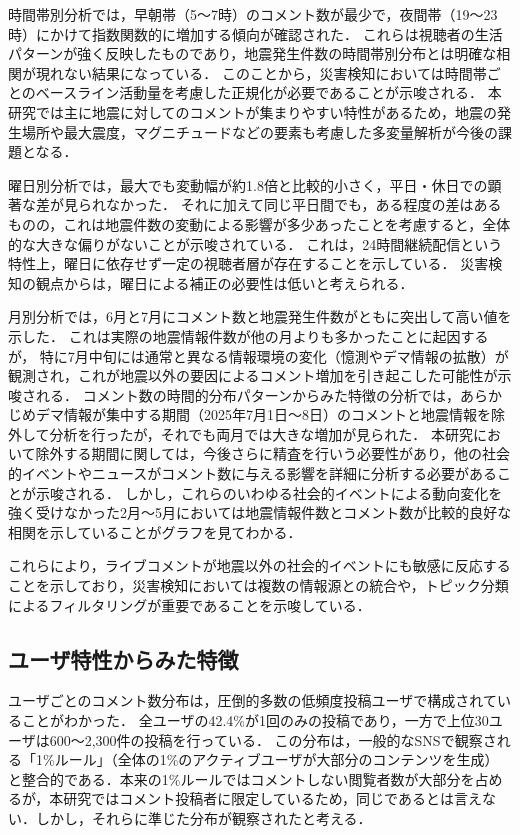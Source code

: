 時間帯別分析では，早朝帯（5〜7時）のコメント数が最少で，夜間帯（19〜23時）にかけて指数関数的に増加する傾向が確認された．
これらは視聴者の生活パターンが強く反映したものであり，地震発生件数の時間帯別分布とは明確な相関が現れない結果になっている．
このことから，災害検知においては時間帯ごとのベースライン活動量を考慮した正規化が必要であることが示唆される．
本研究では主に地震に対してのコメントが集まりやすい特性があるため，地震の発生場所や最大震度，マグニチュードなどの要素も考慮した多変量解析が今後の課題となる．

曜日別分析では，最大でも変動幅が約1.8倍と比較的小さく，平日・休日での顕著な差が見られなかった．
それに加えて同じ平日間でも，ある程度の差はあるものの，これは地震件数の変動による影響が多少あったことを考慮すると，全体的な大きな偏りがないことが示唆されている．
これは，24時間継続配信という特性上，曜日に依存せず一定の視聴者層が存在することを示している．
災害検知の観点からは，曜日による補正の必要性は低いと考えられる．

月別分析では，6月と7月にコメント数と地震発生件数がともに突出して高い値を示した．
これは実際の地震情報件数が他の月よりも多かったことに起因するが，
特に7月中旬には通常と異なる情報環境の変化（憶測やデマ情報の拡散）が観測され，これが地震以外の要因によるコメント増加を引き起こした可能性が示唆される．
コメント数の時間的分布パターンからみた特徴の分析では，あらかじめデマ情報が集中する期間（2025年7月1日〜8日）のコメントと地震情報を除外して分析を行ったが，それでも両月では大きな増加が見られた．
本研究において除外する期間に関しては，今後さらに精査を行いう必要性があり，他の社会的イベントやニュースがコメント数に与える影響を詳細に分析する必要があることが示唆される．
しかし，これらのいわゆる社会的イベントによる動向変化を強く受けなかった2月〜5月においては地震情報件数とコメント数が比較的良好な相関を示していることがグラフを見てわかる．

これらにより，ライブコメントが地震以外の社会的イベントにも敏感に反応することを示しており，災害検知においては複数の情報源との統合や，トピック分類によるフィルタリングが重要であることを示唆している．

\subsection{ユーザ特性からみた特徴}

ユーザごとのコメント数分布は，圧倒的多数の低頻度投稿ユーザで構成されていることがわかった．
全ユーザの42.4\%が1回のみの投稿であり，一方で上位30ユーザは600〜2,300件の投稿を行っている．
この分布は，一般的なSNSで観察される「1\%ルール」（全体の1\%のアクティブユーザが大部分のコンテンツを生成）と整合的である．本来の1\%ルールではコメントしない閲覧者数が大部分を占めるが，本研究ではコメント投稿者に限定しているため，同じであるとは言えない．しかし，それらに準じた分布が観察されたと考える．

